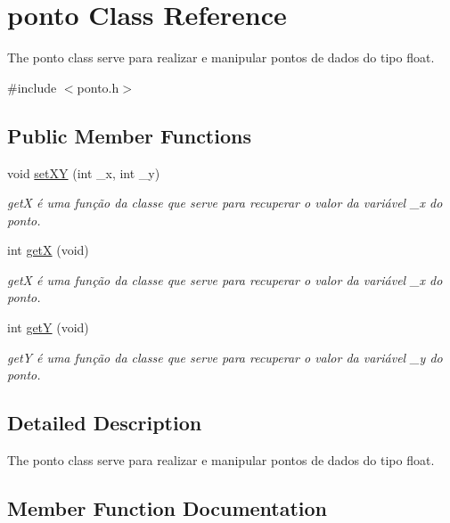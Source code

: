 \hypertarget{classponto}{}\section{ponto Class Reference}
\label{classponto}


The ponto class serve para realizar e manipular pontos de dados do tipo float.  




{\ttfamily \#include $<$ponto.\+h$>$}

\subsection*{Public Member Functions}
\begin{DoxyCompactItemize}
\item 
void \hyperlink{classponto_ab5fec42d0f315fdf2fe31e09bc204537}{set\+XY} (int \+\_\+x, int \+\_\+y)
\begin{DoxyCompactList}\small\item\em getX é uma função da classe que serve para recuperar o valor da variável \+\_\+x do ponto. \end{DoxyCompactList}\item 
int \hyperlink{classponto_a54ea47960cdb00062c859984fc886e3d}{getX} (void)
\begin{DoxyCompactList}\small\item\em getX é uma função da classe que serve para recuperar o valor da variável \+\_\+x do ponto. \end{DoxyCompactList}\item 
int \hyperlink{classponto_a6a311a9c323f3289ad448e8e3fdbf3ae}{getY} (void)
\begin{DoxyCompactList}\small\item\em getY é uma função da classe que serve para recuperar o valor da variável \+\_\+y do ponto. \end{DoxyCompactList}\end{DoxyCompactItemize}


\subsection{Detailed Description}
The ponto class serve para realizar e manipular pontos de dados do tipo float. 

\subsection{Member Function Documentation}
